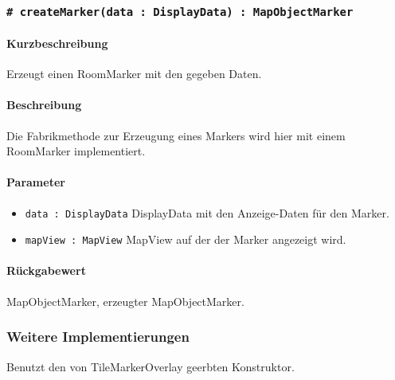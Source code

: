 \subsubsection*{\texttt{\# createMarker(data : DisplayData) : MapObjectMarker}}%
\paragraph*{Kurzbeschreibung}
Erzeugt einen RoomMarker mit den gegeben Daten.
\paragraph*{Beschreibung}
Die Fabrikmethode zur Erzeugung eines Markers wird hier mit einem RoomMarker implementiert.
\paragraph*{Parameter}
\begin{itemize}
    \item \texttt{data : DisplayData} DisplayData mit den Anzeige-Daten für den Marker.
    \item \texttt{mapView : MapView} MapView auf der der Marker angezeigt wird.
\end{itemize}
\paragraph*{Rückgabewert}
MapObjectMarker, erzeugter MapObjectMarker.

\subsubsection*{Weitere Implementierungen}%
Benutzt den von TileMarkerOverlay geerbten Konstruktor.